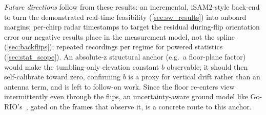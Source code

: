 \emph{Future directions} follow from these results: an incremental,
iSAM2-style back-end to turn the demonstrated real-time feasibility
(\autoref{sec:sw_results}) into onboard margins; per-chirp radar timestamps
to target the residual during-flip orientation error our negative results
place in the measurement model, not the spline (\autoref{sec:backflips});
repeated recordings per regime for powered statistics
(\autoref{sec:stat_scope}).
An absolute-z structural anchor (e.g.\ a floor-plane factor)
would make the tumbling-only elevation constant $b$ observable; it should then
self-calibrate toward zero, confirming $b$ is a proxy for vertical drift rather
than an antenna term, and is left to follow-on work.
Since the floor re-enters view intermittently even through
the flips, an uncertainty-aware ground model like Go-RIO's~\cite{yang2025gorio},
gated on the frames that observe it, is a concrete route to this anchor.
